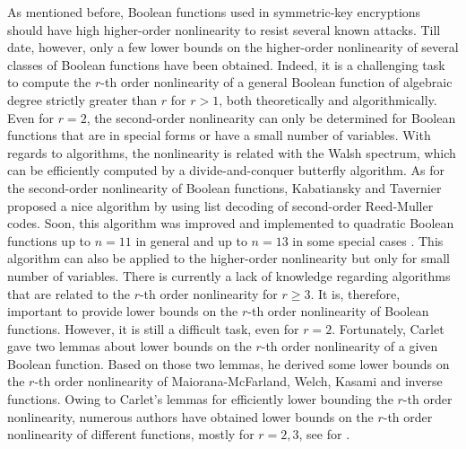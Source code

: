 \documentclass{article}
\newcommand{\0}{\textbf{0}}
\newcommand{\1}{\textbf{1}}
\theoremstyle{plain}
\begin{document}
    As mentioned before, Boolean functions used in symmetric-key encryptions should have high higher-order nonlinearity to resist several known attacks. 
    Till date, however, only a few lower bounds on the higher-order nonlinearity of several classes of Boolean functions have been obtained.
    Indeed, it is a challenging task to compute the $r$-th order nonlinearity of a general Boolean function of algebraic degree strictly greater than $r$ for $r>1$, 
    both theoretically and algorithmically.
    Even for $r=2$, 
    the second-order nonlinearity can only be determined for Boolean functions that are in special forms or have a small number of variables.
    With regards to algorithms, the nonlinearity is related with the Walsh spectrum, which can be efficiently computed by a divide-and-conquer butterfly algorithm.
    As for the second-order nonlinearity of Boolean functions, Kabatiansky and Tavernier \cite{KabatianskyT2005listdecoding_RM_2_n} proposed a nice algorithm by using list decoding of second-order Reed-Muller codes.
    Soon, this algorithm was improved and implemented to quadratic Boolean functions up to $n=11$ in general and up to $n=13$ in some special cases \cite{FourquetT2008improved_listdecoding_RM_2_n}.
    This algorithm can also be applied to the higher-order nonlinearity but only for small number of variables.
    There is currently a lack of knowledge regarding algorithms that are related to the $r$-th order nonlinearity for $r\ge 3$.
    It is, therefore, important to provide lower bounds on the $r$-th order nonlinearity of Boolean functions.
    However, it is still a difficult task, even for $r=2$.
    Fortunately, Carlet \cite{Carlet2008lowbound_NL_profile} gave two lemmas about lower bounds on the $r$-th order nonlinearity of a given Boolean function.
    Based on those two lemmas, he derived some lower bounds on the $r$-th order nonlinearity of Maiorana-McFarland, Welch, Kasami and inverse functions.
    Owing to Carlet's lemmas for efficiently lower bounding the $r$-th order nonlinearity, numerous authors have obtained lower bounds on 
    the $r$-th order nonlinearity of different functions, mostly for $r=2,3$, see for \cite{Carlet2011NL_Profile_Dillon,YanT2020NL_2,Liu2023NL_2,TangYZZ2020NL_2bent,SihemKJ2020NL_2cubic,SunW2009NL_2,SarkarG2009NL_2MM,GangopadhyayST2010NL_2,SunW2011NL_2,GaoT2017NL_2_MM,TangCT2013NL_2bent,GodeG2010NL_3Kasami,Singh2014NL_3_biquadratic,GargK2012NLr_Kasami}.
\end{document}
